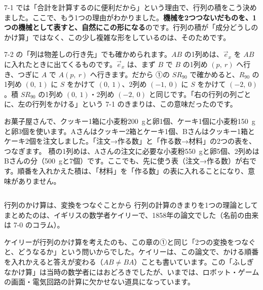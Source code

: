 7-1 では「合計を計算するのに便利だから」という理由で、行列の積をこう決めました。ここで、もう1つの理由がわかりました。\textbf{機械を2つつないだものを、1つの機械として表すと、自然にこの形になる}のです。行列の積が「成分どうしのかけ算」ではなく、この少し複雑な形をしているのは、そのためです。

7-2 の「列は物差しの行き先」でも確かめられます。$AB$ の1列めは、$\vec e_x$ を $AB$ に入れたときに出てくるものです。$\vec e_x$ は、まず $B$ で $B$ の1列め $(p,\ r)$ へ行き、つぎに $A$ で $A(p,\ r)$ へ行きます。だから
①の $SR_{90}$ で確かめると、$R_{90}$ の1列め $(0,\ 1)$ に $S$ をかけて $(0,\ 1)$、2列め $(-1,\ 0)$ に $S$ をかけて $(-2,\ 0)$。積 $SR_{90}$ の1列め $(0,\ 1)$・2列め $(-2,\ 0)$ と同じです。「右の行列の列ごとに、左の行列をかける」という 7-1 のきまりは、この意味だったのです。

\begin{motto}[3]
お菓子屋さんで、クッキー1箱に小麦粉\qty{200}{g}と卵1個、ケーキ1個に小麦粉\qty{150}{g}と卵3個を使います。Aさんはクッキー2箱とケーキ1個、Bさんはクッキー1箱とケーキ2個を注文しました。「注文→作る数」と「作る数→材料」の2つの表を、つなぎます。
積の1列めは、Aさんの注文に必要な小麦粉\qty{550}{g}と卵5個、2列めはBさんの分（\qty{500}{g}と7個）です。ここでも、先に使う表（注文→作る数）が右です。順番を入れかえた積は、「材料」を「作る数」の表に入れることになり、意味がありません。
\end{motto}

\begin{column}{行列のかけ算は、変換をつなぐことから}
行列の計算のきまりを1つの理論としてまとめたのは、イギリスの数学者ケイリーで、1858年の論文でした（名前の由来は 7-0 のコラム）。

ケイリーが行列のかけ算を考えたのも、この章の①と同じ「2つの変換をつなぐと、どうなるか」という問いからでした。ケイリーは、この論文で、かける順番を入れかえると答えが変わる（$AB\neq BA$）ことも書いています。この「ふしぎなかけ算」は当時の数学者にはおどろきでしたが、いまでは、ロボット・ゲームの画面・電気回路の計算に欠かせない道具になっています。
\end{column}

